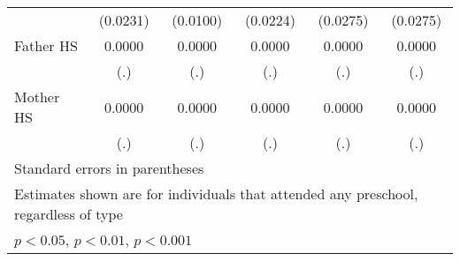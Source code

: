 \begin{table}[htbp]
\begin{tabular}{l*{5}{c}}
            &    (0.0231)         &    (0.0100)         &    (0.0224)         &    (0.0275)         &    (0.0275)         \\
\addlinespace
Father HS   &      0.0000         &      0.0000         &      0.0000         &      0.0000         &      0.0000         \\
            &         (.)         &         (.)         &         (.)         &         (.)         &         (.)         \\
\addlinespace
Mother HS   &      0.0000         &      0.0000         &      0.0000         &      0.0000         &      0.0000         \\
            &         (.)         &         (.)         &         (.)         &         (.)         &         (.)         \\
\bottomrule
\multicolumn{6}{l}{\footnotesize Standard errors in parentheses}\\
\multicolumn{6}{l}{\footnotesize Estimates shown are for individuals that attended any preschool, regardless of type}\\
\multicolumn{6}{l}{\footnotesize \sym{*} \(p<0.05\), \sym{**} \(p<0.01\), \sym{***} \(p<0.001\)}\\
\end{tabular}
\end{table}
